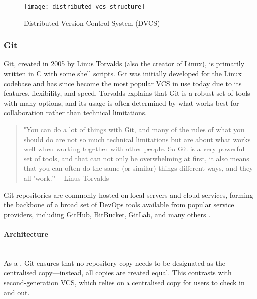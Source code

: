 
\begin{figure}[H]
    \centering
    \texttt{[image: distributed-vcs-structure]}
    \caption{Distributed Version Control System (DVCS)}
    \label{fig:dvcs-structure}
\end{figure}

\subsubsection{Git}
\label{sec:git}
Git, created in 2005 by Linus Torvalds (also the creator of Linux), is primarily written in C with some shell scripts. Git was initially developed for the Linux codebase and has since become the most popular VCS in use today due to its features, flexibility, and speed. Torvalds explains that Git is a robust set of tools with many options, and its usage is often determined by what works best for collaboration rather than technical limitations.

\begin{quote}
    "You can do a lot of things with Git, and many of the rules of what you should do are not so much technical limitations but are about what works well when working together with other people. So Git is a very powerful set of tools, and that can not only be overwhelming at first, it also means that you can often do the same (or similar) things different ways, and they all 'work.'" -- Linus Torvalds \cite{cloer_2019}
\end{quote}

Git repositories are commonly hosted on local servers and cloud services, forming the backbone of a broad set of DevOps tools available from popular service providers, including GitHub, BitBucket, GitLab, and many others \cite{stopak_2019}.
\paragraph{Architecture}
\hfill\medskip\\
As a , Git ensures that no repository copy needs to be designated as the centralised copy—instead, all copies are created equal. This contrasts with second-generation VCS, which relies on a centralised copy for users to check in and out.
\smallskip

